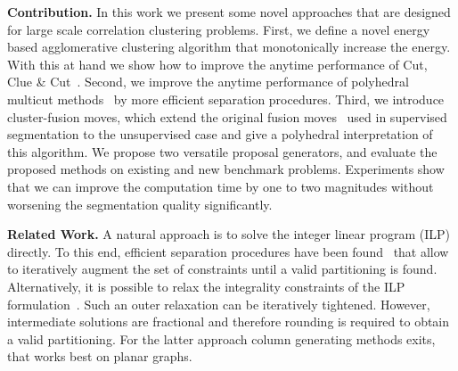 \vspace{0.1cm}
\noindent \textbf{Contribution.}
In this work we present some novel approaches that are designed for large scale correlation clustering problems.
First, we define a novel energy based agglomerative clustering algorithm that monotonically increase the energy.
With this at hand we show how to improve the anytime performance of Cut, Clue \& Cut~\cite{beier_2014_cvpr}.
%
Second, we improve the anytime performance of polyhedral multicut methods~\cite{kappes_2013_arxiv} by more efficient separation procedures.
%
Third, we introduce cluster-fusion moves, which extend the original fusion moves~\cite{Lempitsky-2010} 
used in supervised segmentation to the unsupervised case and give a polyhedral interpretation of this algorithm.
We propose two versatile proposal generators, and evaluate the proposed methods on existing and new benchmark problems.
Experiments show that we can improve the computation time by one to two magnitudes without worsening the segmentation 
quality significantly.
 
\vspace{0.1cm}
\noindent \textbf{Related Work.}
A natural approach is to solve the integer linear program (ILP) directly. 
To this end, efficient separation procedures have been found~\cite{kappes_2011_emmcvpr,kappes_2013_arxiv} that allow to iteratively augment the set of constraints until a valid partitioning is found. 
Alternatively, it is possible to relax the integrality constraints of the ILP formulation~\cite{kappes_2013_arxiv}. 
Such an outer relaxation can be iteratively tightened. However, intermediate solutions are fractional and therefore rounding is required to obtain a valid partitioning.
For the latter approach column generating methods exits, that works best on planar \cite{yarkony_2012_eccv} graphs. %

